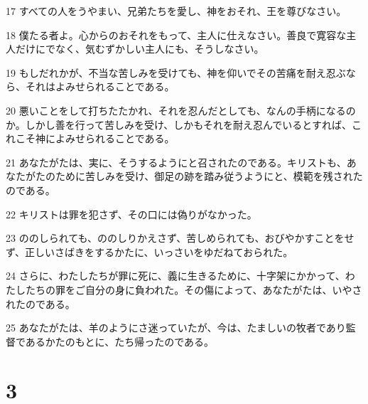 \par 17 すべての人をうやまい、兄弟たちを愛し、神をおそれ、王を尊びなさい。
\par 18 僕たる者よ。心からのおそれをもって、主人に仕えなさい。善良で寛容な主人だけにでなく、気むずかしい主人にも、そうしなさい。
\par 19 もしだれかが、不当な苦しみを受けても、神を仰いでその苦痛を耐え忍ぶなら、それはよみせられることである。
\par 20 悪いことをして打ちたたかれ、それを忍んだとしても、なんの手柄になるのか。しかし善を行って苦しみを受け、しかもそれを耐え忍んでいるとすれば、これこそ神によみせられることである。
\par 21 あなたがたは、実に、そうするようにと召されたのである。キリストも、あなたがたのために苦しみを受け、御足の跡を踏み従うようにと、模範を残されたのである。
\par 22 キリストは罪を犯さず、その口には偽りがなかった。
\par 23 ののしられても、ののしりかえさず、苦しめられても、おびやかすことをせず、正しいさばきをするかたに、いっさいをゆだねておられた。
\par 24 さらに、わたしたちが罪に死に、義に生きるために、十字架にかかって、わたしたちの罪をご自分の身に負われた。その傷によって、あなたがたは、いやされたのである。
\par 25 あなたがたは、羊のようにさ迷っていたが、今は、たましいの牧者であり監督であるかたのもとに、たち帰ったのである。

\chapter{3}

